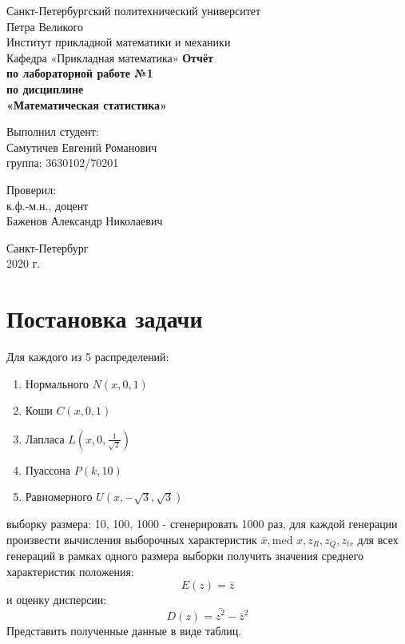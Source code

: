 \documentclass[12pt,a4paper]{article}
\begin{document}
	
\begin{titlepage}
	\begin{center}		
		\vfill	
		Санкт-Петербургский политехнический университет \\
		Петра Великого\\
		\vskip 1cm
		Институт прикладной математики и механики \\
		Кафедра «Прикладная математика»
		\vfill
		\textbf{Отчёт\\
			по лабораторной работе №1\\
			по дисциплине\\
			«Математическая статистика»\\}
		\vfill
	\end{center}
	\vfill
	\hfill
	\begin{minipage}{0.4\textwidth}
		Выполнил студент:\\
		Самутичев Евгений Романович\\
		группа: 3630102/70201\\
	\end{minipage}
	\vfill
	\hfill 
	\begin{minipage}{0.4\textwidth}
		Проверил:\\
		к.ф.-м.н., доцент\\
		Баженов Александр Николаевич\
	\end{minipage}
	\vfill
	\begin{center}
		Санкт-Петербург\\2020 г.
	\end{center}
\end{titlepage}

\tableofcontents
\listoffigures
\pagebreak

\section{Постановка задачи}
Для каждого из 5 распределений:

\begin{enumerate}
	\item Нормального $N(x, 0, 1)$
	\item Коши $C(x, 0, 1)$
	\item Лапласа $L(x, 0, \frac{1}{\sqrt{2}})$
	\item Пуассона $P(k, 10)$
	\item Равномерного $U(x, -\sqrt{3}, \sqrt{3})$	
\end{enumerate}

выборку размера: 10, 100, 1000 - сгенерировать 1000 раз, для каждой генерации произвести вычисления выборочных характеристик $\bar x, \text{med }x, z_R, z_Q, z_{tr}$ для всех генераций в рамках одного размера выборки получить значения среднего характеристик положения:
\begin{equation}
E(z) = \bar z
\end{equation}
и оценку дисперсии:
\begin{equation}
D(z) = \bar {z^2} - {\bar z}^2
\end{equation}
Представить полученные данные в виде таблиц.
\pagebreak
\end{document}
